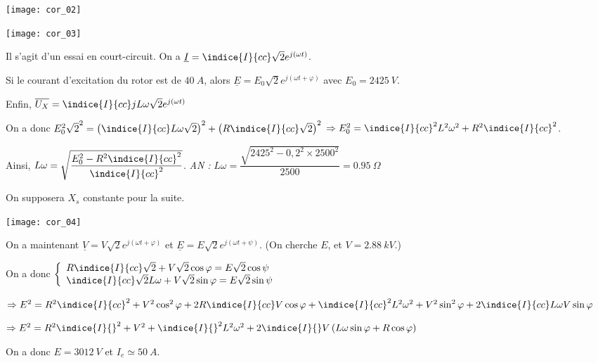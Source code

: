 \ifprof
\begin{marginfigure}
\texttt{[image: cor\_02]}

\texttt{[image: cor\_03]}
\end{marginfigure}
\begin{corrige}
Il s'agit d'un essai en court-circuit. 
On a $\underline{I}=\indice{I}{cc}\sqrt{2}e^{j\left(\omega t\right)}$.

Si le courant d'excitation du rotor est de $\SI{40}{A}$, alors $\underline{E}=E_0\sqrt{2}e^{j\left(\omega t + \varphi\right)}$ avec $E_0 = \SI{2425}{V}$.

Enfin, $\overline{U_X}=\indice{I}{cc}jL\omega\sqrt{2}e^{j\left(\omega t\right)}$


On a donc $E_0^2\sqrt{2}^2 = \left(\indice{I}{cc}L\omega\sqrt{2}\right)^2 + \left(R\indice{I}{cc}\sqrt{2}\right)^2$
$ \Rightarrow  E_0^2 = \indice{I}{cc}^2L^2\omega^2 + R^2\indice{I}{cc}^2$.

Ainsi, $L\omega = \sqrt{\dfrac{E_0^2-R^2\indice{I}{cc}^2}{\indice{I}{cc}^2}}$. \textit{AN :} $L\omega = \dfrac{\sqrt{2425^2-0,2^2\times 2500^2}}{2500} = \SI{0,95}{\Omega}$
\end{corrige}
\else
\fi

On supposera $X_s$ constante pour la suite.

\ifprof
\begin{marginfigure}
\texttt{[image: cor\_04]}
\end{marginfigure}
\begin{corrige}
On a maintenant $\underline{V}=V\sqrt{2}e^{j\left(\omega t + \varphi\right)}$ et 
$\underline{E}=E\sqrt{2}e^{j\left(\omega t + \psi\right)}$. (On cherche $E$, et $V = \SI{2,88}{kV}$.)

On a donc 
$\left\{
\begin{array}{l}
R\indice{I}{cc}\sqrt{2} + V\sqrt{2}\cos \varphi = E\sqrt{2} \cos \psi\\
\indice{I}{cc}\sqrt{2}L\omega + V\sqrt{2}\sin \varphi = E\sqrt{2} \sin\psi \\
\end{array}
\right.$

$\Rightarrow
E^2 = R^2\indice{I}{cc}^2 + V^2\cos^2 \varphi + 2R\indice{I}{cc}V\cos \varphi
+\indice{I}{cc}^2L^2\omega^2 + V^2\sin^2 \varphi
+2\indice{I}{cc}L\omega  V\sin \varphi
$

$\Rightarrow
E^2 = R^2\indice{I}{}^2 + V^2 
+\indice{I}{}^2L^2\omega^2 +2\indice{I}{}V\left(L\omega  \sin \varphi+ R\cos \varphi\right)
$



On a donc $E = \SI{3012}{V}$ et $I_e \simeq \SI{50}{A}$.
\end{corrige}
\else
\fi

